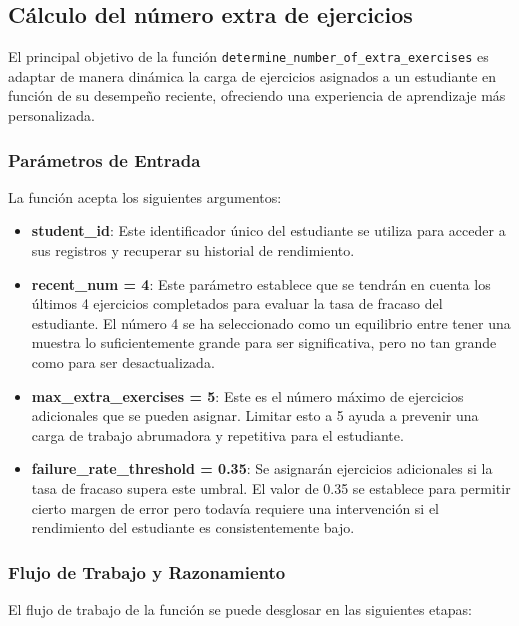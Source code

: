 \subsection{Cálculo del número extra de ejercicios}

El principal objetivo de la función \texttt{determine\_number\_of\_extra\_exercises} es adaptar de manera dinámica la carga de ejercicios asignados a un estudiante en función de su desempeño reciente, ofreciendo una experiencia de aprendizaje más personalizada.

\subsubsection{Parámetros de Entrada}

La función acepta los siguientes argumentos:

\begin{itemize}
    \item \textbf{student\_id}: Este identificador único del estudiante se utiliza para acceder a sus registros y recuperar su historial de rendimiento.
    \item \textbf{recent\_num = 4}: Este parámetro establece que se tendrán en cuenta los últimos 4 ejercicios completados para evaluar la tasa de fracaso del estudiante. El número 4 se ha seleccionado como un equilibrio entre tener una muestra lo suficientemente grande para ser significativa, pero no tan grande como para ser desactualizada.
    \item \textbf{max\_extra\_exercises = 5}: Este es el número máximo de ejercicios adicionales que se pueden asignar. Limitar esto a 5 ayuda a prevenir una carga de trabajo abrumadora y repetitiva para el estudiante.
    \item \textbf{failure\_rate\_threshold = 0.35}: Se asignarán ejercicios adicionales si la tasa de fracaso supera este umbral. El valor de 0.35 se establece para permitir cierto margen de error pero todavía requiere una intervención si el rendimiento del estudiante es consistentemente bajo.
\end{itemize}

\subsubsection{Flujo de Trabajo y Razonamiento}

El flujo de trabajo de la función se puede desglosar en las siguientes etapas:

